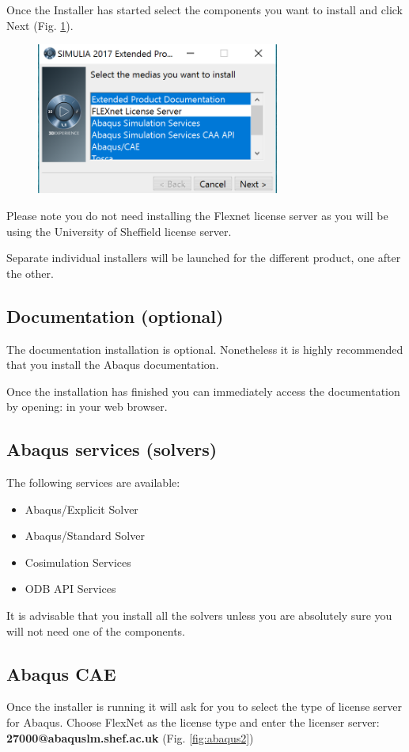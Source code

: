 \documentclass[10pt,a4paper,oneside]{article}
\begin{document}
\begin{enumerate}
Once the Installer has started select the components you want to install and click Next (Fig. \ref{fig:abaqus1}).
\begin{figure}[h]
\centering
\includegraphics[width=8cm]{installer1.png} 
\caption{}
\label{fig:abaqus1}
\end{figure}
Please note you do not need installing the Flexnet license server as you will be using the University of Sheffield license server.

Separate individual installers will be launched for the different product, one after the other.

\subsection{Documentation (optional)}
The documentation installation is optional. Nonetheless it is highly recommended that you install the Abaqus documentation.

Once the installation has finished you can immediately access the documentation by opening:
  in your web browser.

\subsection{Abaqus services (solvers)}
The following services are available:
\begin{itemize}
\item  Abaqus/Explicit Solver
\item Abaqus/Standard Solver
\item Cosimulation Services
\item ODB API Services
\end{itemize}
It is advisable that you install all the solvers unless you are absolutely sure you will not need one of the components. 


\subsection{Abaqus CAE}
Once the installer is running it will ask for you to select the type of license server for Abaqus. Choose FlexNet as the license type and enter the licenser server: \textbf{27000@abaquslm.shef.ac.uk} (Fig. \ref{fig:abaqus2})


\end{enumerate}
\end{document}
